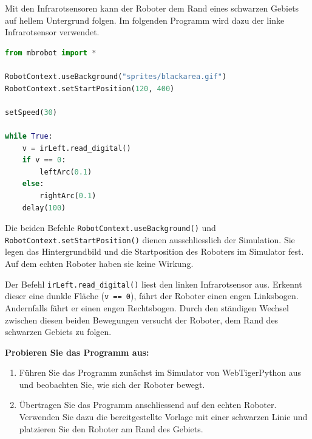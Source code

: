 \begin{myexample}

    Mit den Infrarotsensoren kann der Roboter dem Rand eines schwarzen
    Gebiets auf hellem Untergrund folgen. Im folgenden Programm
    wird dazu der linke Infrarotsensor verwendet.

    \begin{lstlisting}[language=Python]
from mbrobot import *

RobotContext.useBackground("sprites/blackarea.gif")
RobotContext.setStartPosition(120, 400)

setSpeed(30)

while True:
    v = irLeft.read_digital()
    if v == 0:
        leftArc(0.1)
    else:
        rightArc(0.1)
    delay(100)
    \end{lstlisting}

    Die beiden Befehle \texttt{RobotContext.useBackground()}
    und \texttt{RobotContext.setStartPosition()} dienen
    ausschliesslich der Simulation. Sie legen das Hintergrundbild
    und die Startposition des Roboters im Simulator fest.
    Auf dem echten Roboter haben sie keine Wirkung.

    Der Befehl \texttt{irLeft.read\_digital()} liest den
    linken Infrarotsensor aus. Erkennt dieser eine dunkle
    Fläche (\texttt{v == 0}), fährt der Roboter einen engen
    Linksbogen. Andernfalls fährt er einen engen Rechtsbogen.
    Durch den ständigen Wechsel zwischen diesen beiden
    Bewegungen versucht der Roboter, dem Rand des schwarzen
    Gebiets zu folgen.

    \textbf{Probieren Sie das Programm aus:}
    \begin{enumerate}
        \item Führen Sie das Programm zunächst im Simulator
              von WebTigerPython aus und beobachten Sie,
              wie sich der Roboter bewegt.

        \item Übertragen Sie das Programm anschliessend
              auf den echten Roboter. Verwenden Sie dazu
              die bereitgestellte Vorlage mit einer
              schwarzen Linie und platzieren Sie den
              Roboter am Rand des Gebiets.

    \end{enumerate}
\end{myexample}




